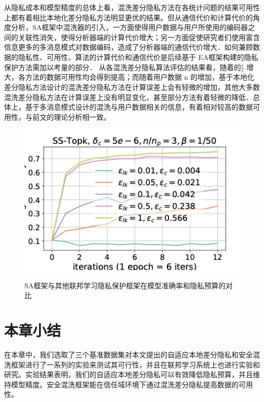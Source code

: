 从隐私成本和模型精度的总体上看，混洗差分隐私方法在各统计问题的结果可用性上都有着相比本地化差分隐私方法明显更优的结果。但从通信代价和计算代价的角度分析，SA框架中混洗器的引入，一方面使得用户数据与用户所使用的编码器之间的关联性消失，使得分析器端的计算代价增大；另一方面促使研究者们使用富含信息更多的多消息模式对数据编码，造成了分析器端的通信代价增大．如何兼顾数据的隐私性、可用性、算法的计算代价和通信代价是后续基于 EA框架构建的隐私保护方法需加以考量的部分． 从各混洗差分隐私算法评估的结果看，随着的$\frac{\epsilon}{c}$
增大，各方法的数据可用性均会得到提高；而随着用户数据 n 的增加，基于本地化差分隐私方法设计的混洗差分隐私方法在计算误差上会有轻微的增加，其他大多数混洗差分隐私方法在计算误差上没有明显变化，甚至部分方法有着轻微的降低．总体上，基于多消息模式设计的混洗与用户数据相关的信息，有着相对较高的数据可用性，与前文的理论分析相一致。

\begin{figure}[!hbt]
\centering
  	\includegraphics[scale=0.8]{fig2/C5/对比实验}%
	\caption{SA框架与其他联邦学习隐私保护框架在模型准确率和隐私预算的对比}
  	\label{fig:EA框架与其他联邦学习隐私保护框架在模型准确率和隐私预算的对比} 
\end{figure}


\section{本章小结}
在本章中，我们选取了三个基准数据集对本文提出的自适应本地差分隐私和安全混洗框架进行了一系列的实验来测试其可行性，并且在联邦学习系统上也进行实验和研究。实验结果表明，我们的自适应本地差分隐私可以有效降低隐私预算，并且维持模型精度。安全混洗框架能在信任域环境下通过混洗差分隐私提高数据的可用性。

